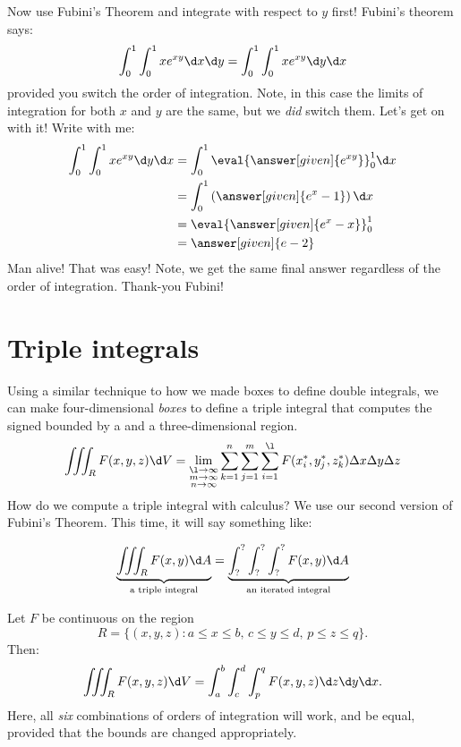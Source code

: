 \documentclass{ximera}
\begin{document}
\begin{example}
\begin{explanation}
    Now use Fubini's Theorem and integrate with respect to $y$ first!
    Fubini's theorem says:
    \[
    \int_0^1 \int_0^1 x e^{xy} \d x \d y =  \int_0^1 \int_0^1 x e^{xy} \d y \d x
    \]
    provided you switch the order of integration. Note, in this case
    the limits of integration for both $x$ and $y$ are the same, but
    we \textit{did} switch them. Let's get on with it! Write with me:
    \begin{align*}
      \int_0^1 \int_0^1 x e^{xy} \d y \d x &= \int_0^1 \eval{\answer[given]{e^{xy}}}_0^1\d x\\
      &= \int_0^1 \left(\answer[given]{e^x - 1}\right) \d x \\
      &= \eval{\answer[given]{e^x - x}}_0^1\\
      &= \answer[given]{e-2}
    \end{align*}
    Man alive! That was easy! Note, we get the same final answer
    regardless of the order of integration. Thank-you Fubini!
  \end{explanation}
\end{example}



\section{Triple integrals}

Using a similar technique to how we made boxes to define double
integrals, we can make four-dimensional \textit{boxes} to define a
triple integral that computes the signed
bounded by a
and a three-dimensional region.
\[
\iiint_R F(x,y,z) \d V = \lim_{\substack{\l\to\infty\\ m\to\infty\\ n\to\infty}}
\sum_{k=1}^n
\sum_{j=1}^m
\sum_{i=1}^\l
F(x^*_i,y^*_j,z_k^*)\Delta x\Delta y\Delta z
\]
How do we compute a triple integral with calculus? We use our second
version of Fubini's Theorem. This time, it will say something like:

\[
\underbrace{\iiint_R F(x,y) \d A}_{\text{a triple integral}} = \underbrace{\int_?^? \int_?^? \int_?^? F(x,y) \d A}_{\text{an iterated integral}}
\]

\begin{theorem}
  Let $F$ be continuous on the region
  \[
  R = \{(x,y,z):\text{$a\le x\le b$, $c\le y\le d$, $p\le z\le q$}\}.
  \]
  Then:
  \[
  \iiint_R F(x,y,z) \d V  = \int_a^b\int_c^d\int_p^q F(x,y,z)\d z \d y\d x.
  \]
  Here, all \textit{six} combinations of orders of integration will
  work, and be equal, provided that the bounds are changed
  appropriately.
\end{theorem}
\end{document}

